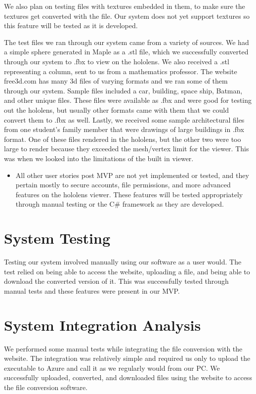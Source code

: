     We also plan on testing files with textures embedded in them, to make sure the textures get converted with the file. Our system does not yet support textures so this feature will be tested as it is developed. 

    The test files we ran through our system came from a variety of sources. We had a simple sphere generated in Maple as a .stl file, which we successfully converted through our system to .fbx to view on the hololens. We also received a .stl representing a column, sent to us from a mathematics professor. The website free3d.com has many 3d files of varying formats and we ran some of them through our system. Sample files included a car, building, space ship, Batman, and other unique files. These files were available as .fbx and were good for testing out the hololens, but usually other formats came with them that we could convert them to .fbx as well. Lastly, we received some sample architectural files from one student's family member that were drawings of large buildings in .fbx format. One of these files rendered in the hololens, but the other two were too large to render because they exceeded the mesh/vertex limit for the viewer. This was when we looked into the limitations of the built in viewer.

\begin{itemize} \item All other user stories post MVP are not yet implemented or tested, and they pertain mostly to secure accounts, file permissions, and more advanced features on the hololens viewer. 
These features will be tested appropriately through manual testing or the C\# framework as they are developed. \end{itemize}

\section{System Testing}
Testing our system involved manually using our software as a user would.
The test relied on being able to access the website, uploading a file, and being able to download the converted version of it.
This was successfully tested through manual tests and these features were present in our MVP.

\section{System Integration Analysis}
We performed some manual tests while integrating the file conversion with the website.
The integration was relatively simple and required us only to upload the executable to Azure and call it as we regularly would from our PC.
We successfully uploaded, converted, and downloaded files using the website to access the file conversion software.

